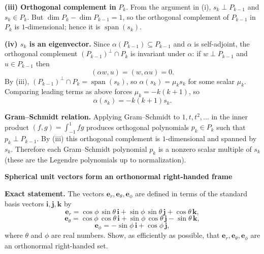 \begin{solution}
\textbf{(iii) Orthogonal complement in } $P_k$.
From the argument in (i), $s_k\perp P_{k-1}$ and $s_k\in P_k$.
But $\dim P_k-\dim P_{k-1}=1$, so the orthogonal complement of $P_{k-1}$ in $P_k$ is $1$-dimensional; hence it is $\operatorname{span}(s_k)$.

\textbf{(iv) $s_k$ is an eigenvector.}
Since $\alpha(P_{k-1})\subseteq P_{k-1}$ and $\alpha$ is self-adjoint, the orthogonal complement $(P_{k-1})^\perp\cap P_k$ is invariant under $\alpha$:
if $w\perp P_{k-1}$ and $u\in P_{k-1}$ then
\[
(\alpha w,u)=(w,\alpha u)=0.
\]
By (iii), $(P_{k-1})^\perp\cap P_k=\operatorname{span}(s_k)$, so $\alpha(s_k)=\mu_k s_k$ for some scalar $\mu_k$.
Comparing leading terms as above forces $\mu_k=-k(k+1)$, so
\[
\alpha(s_k)=-k(k+1)s_k.
\]

\textbf{Gram--Schmidt relation.}
Applying Gram--Schmidt to $1,t,t^2,\dots$ in the inner product $(f,g)=\int_{-1}^{1}fg$
produces orthogonal polynomials $p_k\in P_k$ such that $p_k\perp P_{k-1}$.
By (iii) this orthogonal complement is $1$-dimensional and spanned by $s_k$.
Therefore each Gram--Schmidt polynomial $p_k$ is a nonzero scalar multiple of $s_k$
(these are the Legendre polynomials up to normalization).
\end{solution}

\begin{problem}[CP-I-0047]
\label{prob:cp-i-0047}
\textbf{Spherical unit vectors form an orthonormal right-handed frame}

\textbf{Exact statement.}
\hspace*{1.5em}The vectors \(\mathbf e_r,\mathbf e_\theta,\mathbf e_\phi\) are defined in terms of the standard basis vectors
\(\mathbf i,\mathbf j,\mathbf k\) by
\[
\mathbf e_r=\cos\phi\,\sin\theta\,\mathbf i+\sin\phi\,\sin\theta\,\mathbf j+\cos\theta\,\mathbf k,
\]
\[
\mathbf e_\theta=\cos\phi\,\cos\theta\,\mathbf i+\sin\phi\,\cos\theta\,\mathbf j-\sin\theta\,\mathbf k,
\]
\[
\mathbf e_\phi=-\sin\phi\,\mathbf i+\cos\phi\,\mathbf j,
\]
where \(\theta\) and \(\phi\) are real numbers. Show, as efficiently as possible, that
\(\mathbf e_r,\mathbf e_\theta,\mathbf e_\phi\) are an orthonormal right-handed set.

\end{problem}

